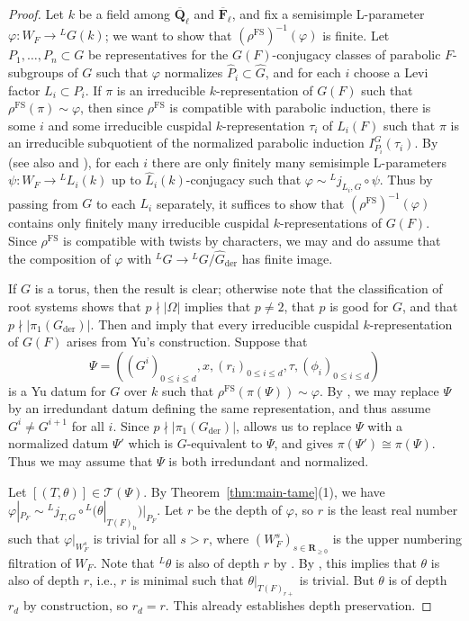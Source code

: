 \documentclass[reqno]{amsart}
\numberwithin{equation}{subsection}
\newcommand{\F}{\mathbf{F}}
\newcommand{\RR}{\mathbf{R}}
\newcommand{\Q}{\mathbf{Q}}
\newcommand{\ol}[1]{\overline{#1}}
\newcommand{\wh}[1]{\widehat{#1}}
\newcommand{\co}{\colon}
\newcommand{\ld}{{}^L}
\newcommand\cT{\mathcal{T}}
\DeclareMathOperator{\FS}{FS}
\DeclareMathOperator{\der}{der}
\theoremstyle{remark}
\numberwithin{equation}{subsection}
\numberwithin{figure}{subsection}
\begin{document}
\begin{proof}
Let $k$ be a field among $\ol\Q_\ell$ and $\ol\F_\ell$, and fix a semisimple L-parameter $\varphi\co W_F \to \ld G(k)$; we want to show that $(\rho^{\FS})^{-1}(\varphi)$ is finite. Let $P_1, \dots, P_n \subset G$ be representatives for the $G(F)$-conjugacy classes of parabolic $F$-subgroups of $G$ such that $\varphi$ normalizes $\wh P_i \subset \wh G$, and for each $i$ choose a Levi factor $L_i \subset P_i$. If $\pi$ is an irreducible $k$-representation of $G(F)$ such that $\rho^{\FS}(\pi) \sim \varphi$, then since $\rho^{\FS}$ is compatible with parabolic induction, there is some $i$ and some irreducible cuspidal $k$-representation $\tau_i$ of $L_i(F)$ such that $\pi$ is an irreducible subquotient of the normalized parabolic induction $I_{P_i}^G(\tau_i)$. By \cite[Corollary 2.4]{DHKM} (see also \cite[Theorem 1.1]{Cot24} and \cite[Lemma 3.13]{Cot25}), for each $i$ there are only finitely many semisimple L-parameters $\psi\co W_F \to \ld L_i(k)$ up to $\wh L_i(k)$-conjugacy such that $\varphi\sim \ld j_{L_i,G} \circ \psi$. Thus by passing from $G$ to each $L_i$ separately, it suffices to show that $(\rho^{\FS})^{-1}(\varphi)$ contains only finitely many irreducible cuspidal $k$-representations of $G(F)$. Since $\rho^{\FS}$ is compatible with twists by characters, we may and do assume that the composition of $\varphi$ with $\ld G \to \ld G/\wh G_{\der}$ has finite image. 

If $G$ is a torus, then the result is clear; otherwise note that the classification of root systems shows that $p\nmid|\Omega|$ implies that $p\neq2$, that $p$ is good for $G$, and that $p\nmid|\pi_1(G_{\der})|$. Then \cite[Theorem 8.1]{Fin21} and \cite[Theorem 4.1]{Fin22} imply that every irreducible cuspidal $k$-representation of $G(F)$ arises from Yu's construction. Suppose that
\[
\Psi = ((G^i)_{0\leq i\leq d}, x, (r_i)_{0\leq i\leq d}, \tau, (\phi_i)_{0\leq i\leq d})
\]
is a Yu datum for $G$ over $k$ such that $\rho^{\FS}(\pi(\Psi)) \sim \varphi$.
By \cite[Lemma~6.6.1]{CF26a}, we may replace $\Psi$ by an irredundant datum defining the same representation, and thus assume $G^i\neq G^{i+1}$ for all $i$. Since $p\nmid|\pi_1(G_{\der})|$, \cite[Lemma~3.7.2]{Kal19} allows us to replace $\Psi$ with a normalized datum $\Psi'$ which is $G$-equivalent to $\Psi$, and \cite[Proposition~6.6.3]{CF26a} gives $\pi(\Psi')\cong\pi(\Psi)$. Thus we may assume that $\Psi$ is both irredundant and normalized.


Let $[(T, \theta)] \in \cT(\Psi)$. By Theorem~\ref{thm:main-tame}(1), we have $\varphi|_{P_F}\sim \ld j_{T,G} \circ \ld(\theta|_{T(F)_{\mathrm{b}}})|_{P_F}$. Let $r$ be the depth of $\varphi$, so $r$ is the least real number such that $\varphi|_{W_F^s}$ is trivial for all $s > r$, where $(W_F^s)_{s \in \RR_{\geq 0}}$ is the upper numbering filtration of $W_F$. Note that $\ld\theta$ is also of depth $r$ by \cite[Lemma~7.2.4]{CF26a}. By \cite[Theorem 7.10]{Yu09}, this implies that $\theta$ is also of depth $r$, i.e., $r$ is minimal such that $\theta|_{T(F)_{r+}}$ is trivial. But $\theta$ is of depth $r_d$ by construction, so $r_d = r$. This already establishes depth preservation.


\end{proof}
\end{document}

